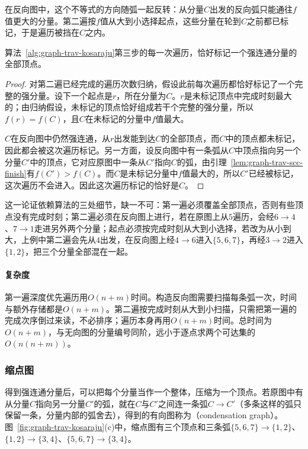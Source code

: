 在反向图中，这个不等式的方向随弧一起反转：从分量$C$出发的反向弧只能通往$f$值更大的分量。第二遍按$f$值从大到小选择起点，这些分量在轮到$C$之前都已标记，于是遍历被挡在$C$之内。

\begin{theorem}[Kosaraju算法的正确性]
\label{thm:graph-trav-kosaraju}
算法~\ref{alg:graph-trav-kosaraju}第三步的每一次遍历，恰好标记一个强连通分量的全部顶点。
\end{theorem}

\begin{proof}
对第二遍已经完成的遍历次数归纳，假设此前每次遍历都恰好标记了一个完整的强分量。设下一个起点是$r$，所在分量为$C$。$r$是未标记顶点中完成时刻最大的；由归纳假设，未标记的顶点恰好组成若干个完整的强分量，所以$f(r)=f(C)$，且$C$在未标记的分量中$f$值最大。

$C$在反向图中仍然强连通，从$r$出发能到达$C$的全部顶点，而$C$中的顶点都未标记，因此都会被这次遍历标记。另一方面，设反向图中有一条弧从$C$中顶点指向另一个分量$C'$中的顶点，它对应原图中一条从$C'$指向$C$的弧，由引理~\ref{lem:graph-trav-scc-finish}有$f(C')>f(C)$。而$C$是未标记分量中$f$值最大的，所以$C'$已经被标记，这次遍历不会进入。因此这次遍历标记的恰好是$C$。
\end{proof}

这一论证依赖算法的三处细节，缺一不可：第一遍必须覆盖全部顶点，否则有些顶点没有完成时刻；第二遍必须在反向图上进行，若在原图上从$5$遍历，会经$6\to4$、$7\to1$走进另外两个分量；起点必须按完成时刻从大到小选择，若改为从小到大，上例中第二遍会先从$4$出发，在反向图上经$4\to6$进入$\{5,6,7\}$，再经$3\to2$进入$\{1,2\}$，把三个分量全部混在一起。

\paragraph{复杂度}
第一遍深度优先遍历用$O(n+m)$时间。构造反向图需要扫描每条弧一次，时间与额外存储都是$O(n+m)$。第二遍按完成时刻从大到小扫描，只需把第一遍的完成次序倒过来读，不必排序；遍历本身再用$O(n+m)$时间。总时间为$O(n+m)$，与无向图的分量编号同阶，远小于逐点求两个可达集的$O(n(n+m))$。

\subsubsection{缩点图}
\label{sec:graph-trav-condensation}

得到强连通分量后，可以把每个分量当作一个整体，压缩为一个顶点。若原图中有从分量$C$指向另一分量$C'$的弧，就在$C$与$C'$之间连一条弧$C\to C'$（多条这样的弧只保留一条，分量内部的弧舍去），得到的有向图称为（condensation graph）。图~\ref{fig:graph-trav-kosaraju}(c)中，缩点图有三个顶点和三条弧$\{5,6,7\}\to\{1,2\}$、$\{1,2\}\to\{3,4\}$、$\{5,6,7\}\to\{3,4\}$。

